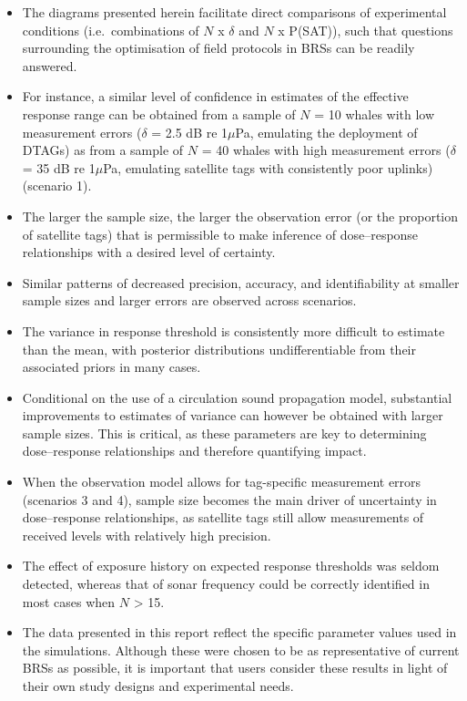 \documentclass[
]{article}
\providecommand{\tightlist}{%
  \setlength{\itemsep}{0pt}\setlength{\parskip}{0pt}}
\renewcommand{\tightlist}{\setlength{\itemsep}{2ex}\setlength{\parskip}{0pt}}
\begin{document}
\begin{itemize}
\tightlist
\item
  The diagrams presented herein facilitate direct comparisons of experimental conditions (i.e.~combinations of \(N\) x \(\delta\) and \(N\) x P(SAT)), such that questions surrounding the optimisation of field protocols in BRSs can be readily answered.
\item
  For instance, a similar level of confidence in estimates of the effective response range can be obtained from a sample of \(N\) = 10 whales with low measurement errors (\(\delta\) = 2.5 dB re 1\(\mu\)Pa, emulating the deployment of DTAGs) as from a sample of \(N\) = 40 whales with high measurement errors (\(\delta\) = 35 dB re 1\(\mu\)Pa, emulating satellite tags with consistently poor uplinks) (scenario 1).
\item
  The larger the sample size, the larger the observation error (or the proportion of satellite tags) that is permissible to make inference of dose--response relationships with a desired level of certainty.
\item
  Similar patterns of decreased precision, accuracy, and identifiability at smaller sample sizes and larger errors are observed across scenarios.
\item
  The variance in response threshold is consistently more difficult to estimate than the mean, with posterior distributions undifferentiable from their associated priors in many cases.
\item
  Conditional on the use of a circulation sound propagation model, substantial improvements to estimates of variance can however be obtained with larger sample sizes. This is critical, as these parameters are key to determining dose--response relationships and therefore quantifying impact.
\item
  When the observation model allows for tag-specific measurement errors (scenarios 3 and 4), sample size becomes the main driver of uncertainty in dose--response relationships, as satellite tags still allow measurements of received levels with relatively high precision.
\item
  The effect of exposure history on expected response thresholds was seldom detected, whereas that of sonar frequency could be correctly identified in most cases when \(N\) \textgreater{} 15.
\item
  The data presented in this report reflect the specific parameter values used in the simulations. Although these were chosen to be as representative of current BRSs as possible, it is important that users consider these results in light of their own study designs and experimental needs.
\end{itemize}
\end{document}
